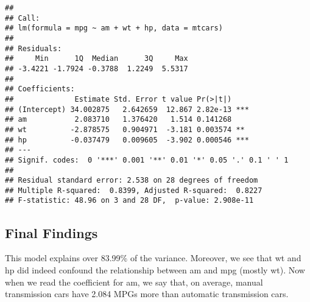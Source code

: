 \documentclass[]{article}
\begin{document}
\begin{verbatim}
## 
## Call:
## lm(formula = mpg ~ am + wt + hp, data = mtcars)
## 
## Residuals:
##     Min      1Q  Median      3Q     Max 
## -3.4221 -1.7924 -0.3788  1.2249  5.5317 
## 
## Coefficients:
##              Estimate Std. Error t value Pr(>|t|)    
## (Intercept) 34.002875   2.642659  12.867 2.82e-13 ***
## am           2.083710   1.376420   1.514 0.141268    
## wt          -2.878575   0.904971  -3.181 0.003574 ** 
## hp          -0.037479   0.009605  -3.902 0.000546 ***
## ---
## Signif. codes:  0 '***' 0.001 '**' 0.01 '*' 0.05 '.' 0.1 ' ' 1
## 
## Residual standard error: 2.538 on 28 degrees of freedom
## Multiple R-squared:  0.8399, Adjusted R-squared:  0.8227 
## F-statistic: 48.96 on 3 and 28 DF,  p-value: 2.908e-11
\end{verbatim}

\subsection{Final Findings}\label{final-findings}

This model explains over 83.99\% of the variance. Moreover, we see that
wt and hp did indeed confound the relationship between am and mpg
(mostly wt). Now when we read the coefficient for am, we say that, on
average, manual transmission cars have 2.084 MPGs more than automatic
transmission cars.
\end{document}
